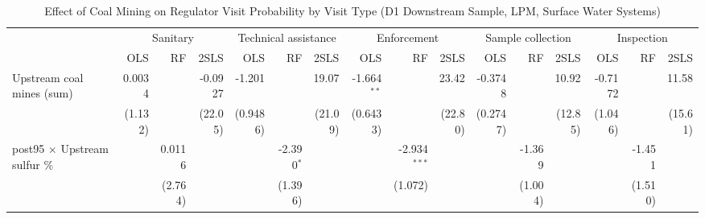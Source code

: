 
\begin{table}[htbp]
   
   \caption{\label{tab:h2_snsv_d12_surfacewater} Effect of Coal Mining on Regulator Visit Probability by Visit Type (D1 Downstream Sample, LPM, Surface Water Systems)}
   \bigskip
   
   \centering
   
   \begin{adjustbox}{width = \textwidth, center}
      
      
      \begin{tabular}{lrrrrrrrrrrrrrrr}
         \toprule
         
          & \multicolumn{3}{c}{Sanitary} & \multicolumn{3}{c}{Technical assistance} & \multicolumn{3}{c}{Enforcement} & \multicolumn{3}{c}{Sample collection} & \multicolumn{3}{c}{Inspection}\\
         
                                                                  & OLS           & RF            & 2SLS          & OLS           & RF            & 2SLS          & OLS           & RF             & 2SLS          & OLS           & RF            & 2SLS          & OLS           & RF            & 2SLS\\  
         
         \midrule 
         Upstream coal mines (sum)                                & 0.0034        &               & -0.0927       & -1.201        &               & 19.07         & -1.664$^{**}$ &                & 23.42         & -0.3748       &               & 10.92         & -0.7172       &               & 11.58\\   
                                                                  & (1.132)       &               & (22.05)       & (0.9486)      &               & (21.09)       & (0.6433)      &                & (22.80)       & (0.2747)      &               & (12.85)       & (1.046)       &               & (15.61)\\   
         post95 $\times$ Upstream sulfur \%                       &               & 0.0116        &               &               & -2.390$^{*}$  &               &               & -2.934$^{***}$ &               &               & -1.369        &               &               & -1.451        &   \\   
                                                                  &               & (2.764)       &               &               & (1.396)       &               &               & (1.072)        &               &               & (1.004)       &               &               & (1.510)       &   \\   
         

\end{tabular}
\end{adjustbox}
\end{table}
